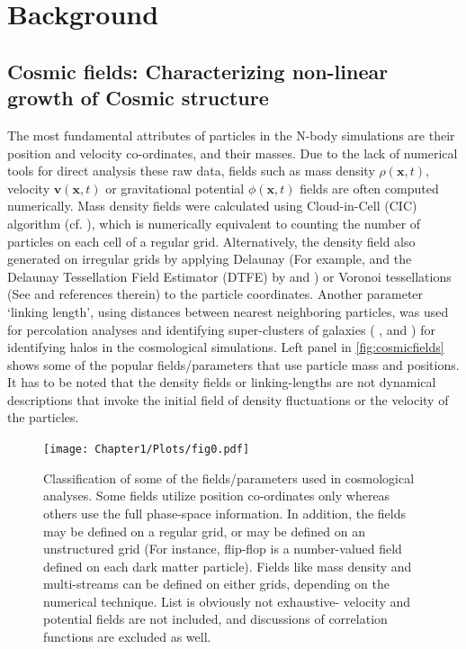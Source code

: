 \chapter{Background}\label{chapter2}


\section{Cosmic fields: Characterizing non-linear growth of Cosmic structure}


The most fundamental attributes of particles in the N-body simulations are their position and velocity co-ordinates, and their masses. Due to the lack of numerical tools for direct analysis these raw data, fields such as mass density $\rho(\mathbf{x}, t)$, velocity $\mathbf{v}(\mathbf{x}, t)$ or gravitational potential $\phi(\mathbf{x}, t)$ fields are often computed numerically. Mass density fields were calculated using Cloud-in-Cell (CIC) algorithm (cf. \citealt{Hockney1988}), which is numerically equivalent to counting the number of particles on each cell of a regular grid. Alternatively, the density field also generated on irregular grids by applying Delaunay (For example, \citealt{Icke1991} and the Delaunay Tessellation Field Estimator (DTFE) by \citealt{Schaap2000} and \citealt{Weygaert2009a}) or Voronoi tessellations (See \citealt{Schaap2000} and references therein) to the particle coordinates. Another parameter `linking length', using distances between nearest neighboring particles, was used for percolation analyses and identifying super-clusters of galaxies ( \citealt{Zeldovich1982}, \citealt{Shandarin1983} and \citealt{Shandarin1983b}) for identifying halos \citealt{Davis1985} in the cosmological simulations. Left panel in \autoref{fig:cosmicfields} shows some of the popular fields/parameters that use particle mass and positions. It has to be noted that the density fields or linking-lengths are not dynamical descriptions that invoke the initial field of density fluctuations or the velocity of the particles. 


\begin{figure}
\begin{minipage}[t]{0.99\linewidth}
 \centering\texttt{[image: Chapter1/Plots/fig0.pdf]} 
\end{minipage}\hfill
{}
\caption{Classification of some of the fields/parameters used in cosmological analyses. Some fields utilize position co-ordinates only whereas others use the full phase-space information. In addition, the fields may be defined on a regular grid, or may be defined on an unstructured grid (For instance, flip-flop is a number-valued field defined on each dark matter particle). Fields like mass density and multi-streams can be defined on either grids, depending on the numerical technique. List is obviously not exhaustive- velocity and potential fields are not included, and discussions of correlation functions are excluded as well.}
\label{fig:cosmicfields}
\end{figure}


